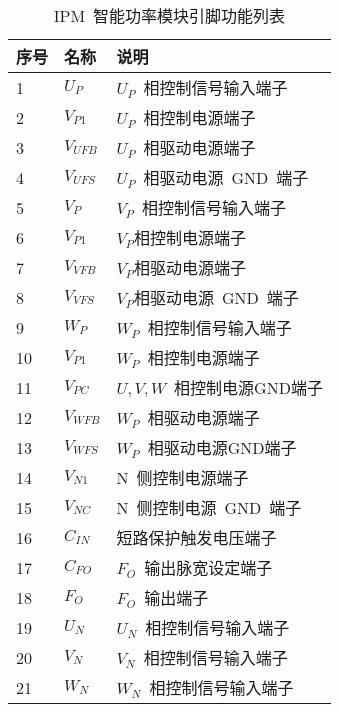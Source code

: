 \begin{table}[ht]
  \centering
  \caption{IPM~智能功率模块引脚功能列表}
  \label{tab:chap1:IPM_function}
  \begin{tabular}{C{3.6cm}L{1.8cm}L{7.2cm}}
    \toprule
    \textbf{序号} & \textbf{名称} & \textbf{说明}                  \\
                 & $U_P$         & $U_P$~相控制信号输入端子       \\
    2             & $V_{P1}$      & $U_P$~相控制电源端子           \\
    3             & $V_{UFB}$     & $U_P$~相驱动电源端子           \\
    4             & $V_{UFS}$     & $U_P$~相驱动电源~GND~端子      \\
    5             & $V_P$         & $V_P$~相控制信号输入端子       \\
    6             & $V_{P1}$      & $V_P$相控制电源端子            \\
    7             & $V_{VFB}$     & $V_P$相驱动电源端子            \\
    8             & $V_{VFS}$     & $V_P$相驱动电源~GND~端子       \\
    9             & $W_P$         & $W_P$~相控制信号输入端子       \\
    10            & $V_{P1}$      & $W_P$~相控制电源端子           \\
    11            & $V_{PC}$      & $U,V,W$~相控制电源GND端子      \\
    12            & $V_{WFB}$     & $W_P$~相驱动电源端子           \\
    13            & $V_{WFS}$     & $W_P$~相驱动电源GND端子        \\
    14            & $V_{N1}$      & N~侧控制电源端子               \\
    15            & $V_{NC}$      & N~侧控制电源~GND~端子          \\
    16            & $C_{IN}$      & 短路保护触发电压端子           \\
    17            & $C_{FO}$      & $F_O$~输出脉宽设定端子         \\
    18            & $F_O$         & $F_O$~输出端子                 \\
    19            & $U_N$         & $U_N$~相控制信号输入端子       \\
    20            & $V_N$         & $V_N$~相控制信号输入端子       \\
    21            & $W_N$         & $W_N$~相控制信号输入端子       \\

\end{tabular}
\end{table}
